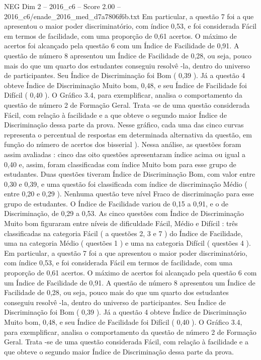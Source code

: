 \begin{textsample}{NEG Dim 2 – 2016\_c6 – Score 2.00 – 2016\_c6/enade\_2016\_med\_d7a7806f6b.txt}
Em particular, a questão 7 foi a que apresentou o maior poder discriminatório, com índice 0,53, e foi considerada Fácil em termos de facilidade, com uma proporção de 0,61 acertos.
O máximo de acertos foi alcançado pela questão 6 com um Índice de Facilidade de 0,91.
A questão de número 8 apresentou um Índice de Facilidade de 0,28, ou seja, pouco mais do que um quarto dos estudantes conseguiu resolvê -la, dentro do universo de participantes.
Seu Índice de Discriminação foi Bom ( 0,39 ).
Já a questão 4 obteve Índice de Discriminação Muito bom, 0,48, e seu Índice de Facilidade foi Difícil ( 0,40 ).
O Gráfico 3.4, para exemplificar, analisa o comportamento da questão de número 2 de Formação Geral.
Trata -se de uma questão considerada Fácil, com relação à facilidade e a que obteve o segundo maior Índice de Discriminação dessa parte da prova.
Nesse gráfico, cada uma das cinco curvas representa o percentual de respostas em determinada alternativa da questão, em função do número de acertos dos bisserial ).
Nessa análise, as questões foram assim avaliadas : cinco das oito questões apresentaram índice acima ou igual a 0,40 e, assim, foram classificadas com índice Muito bom para esse grupo de estudantes.
Duas questões tiveram Índice de Discriminação Bom, com valor entre 0,30 e 0,39, e uma questão foi classificada com índice de discriminação Médio ( entre 0,20 e 0,29 ).
Nenhuma questão teve nível Fraco de discriminação para esse grupo de estudantes.
O Índice de Facilidade variou de 0,15 a 0,91, e o de Discriminação, de 0,29 a 0,53.
As cinco questões com Índice de Discriminação Muito bom figuraram entre níveis de dificuldade Fácil, Médio e Difícil : três classificadas na categoria Fácil ( a questões 2, 3 e 7 ) do Índice de Facilidade, uma na categoria Médio ( questões 1 ) e uma na categoria Difícil ( questões 4 ).
Em particular, a questão 7 foi a que apresentou o maior poder discriminatório, com índice 0,53, e foi considerada Fácil em termos de facilidade, com uma proporção de 0,61 acertos.
O máximo de acertos foi alcançado pela questão 6 com um Índice de Facilidade de 0,91.
A questão de número 8 apresentou um Índice de Facilidade de 0,28, ou seja, pouco mais do que um quarto dos estudantes conseguiu resolvê -la, dentro do universo de participantes.
Seu Índice de Discriminação foi Bom ( 0,39 ).
Já a questão 4 obteve Índice de Discriminação Muito bom, 0,48, e seu Índice de Facilidade foi Difícil ( 0,40 ).
O Gráfico 3.4, para exemplificar, analisa o comportamento da questão de número 2 de Formação Geral.
Trata -se de uma questão considerada Fácil, com relação à facilidade e a que obteve o segundo maior Índice de Discriminação dessa parte da prova.

\end{textsample}
